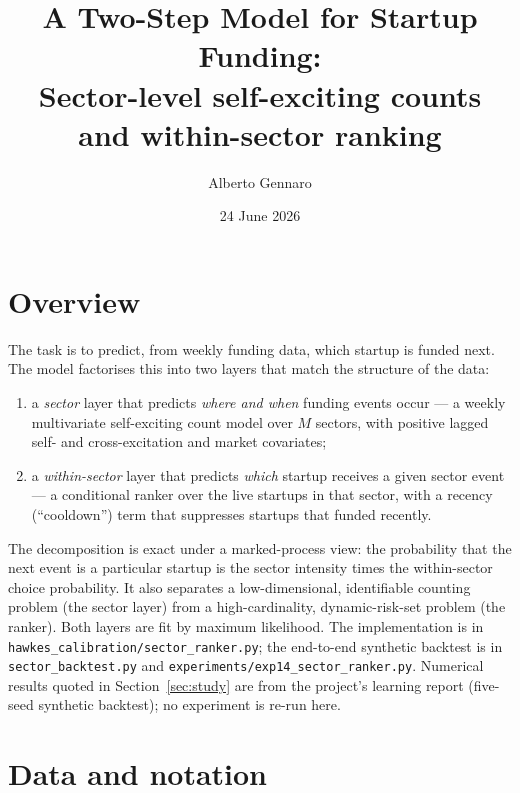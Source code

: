 \documentclass[11pt]{article}
\title{\bfseries A Two-Step Model for Startup Funding:\\[2pt]
\large Sector-level self-exciting counts and within-sector ranking}
\author{Alberto Gennaro}
\date{24 June 2026}
\newcommand{\code}[1]{\texttt{#1}}
\begin{document}
\maketitle

\section{Overview}

The task is to predict, from weekly funding data, which startup is funded next. The
model factorises this into two layers that match the structure of the data:

\begin{enumerate}[leftmargin=1.6em,itemsep=2pt]
\item a \emph{sector} layer that predicts \emph{where and when} funding events occur ---
a weekly multivariate self-exciting count model over $M$ sectors, with positive lagged
self- and cross-excitation and market covariates;
\item a \emph{within-sector} layer that predicts \emph{which} startup receives a given
sector event --- a conditional ranker over the live startups in that sector, with a
recency (``cooldown'') term that suppresses startups that funded recently.
\end{enumerate}

The decomposition is exact under a marked-process view: the probability that the next
event is a particular startup is the sector intensity times the within-sector choice
probability. It also separates a low-dimensional, identifiable counting problem (the
sector layer) from a high-cardinality, dynamic-risk-set problem (the ranker). Both
layers are fit by maximum likelihood. The implementation is in
\code{hawkes\_calibration/sector\_ranker.py}; the end-to-end synthetic backtest is in
\code{sector\_backtest.py} and \code{experiments/exp14\_sector\_ranker.py}. Numerical
results quoted in Section~\ref{sec:study} are from the project's learning report
(five-seed synthetic backtest); no experiment is re-run here.

\section{Data and notation}
\end{document}
